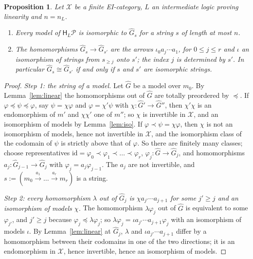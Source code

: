 \documentclass[11pt]{amsart}
\newtheorem{prop}[thm]{Proposition}
\theoremstyle{definition}
\newcommand{\HH}{\mathsf H}
\newcommand{\cX}{\mathcal X}
\newcommand{\cP}{\mathcal P}
\newcommand{\id}{\mathrm{id}}
\begin{document}
\begin{prop}\label{prop:strings}
Let $\cX$ be a finite EI-category, $L$ an intermediate logic proving
linearity and $n=n_L$.
\begin{enumerate}
\item[(a)] Every model of $\HH_L\cP$ is isomorphic to $\hat G_s$ for a
string $s$ of length at most $n$.
\item[(b)] The homomorphisms $\hat G_s\to\hat G_{s'}$ are the arrows
$\iota_0a_j\cdots a_1$, for $0\le j\le r$ and $\iota$ an isomorphism of
strings from $s_{\ge j}$ onto $s'$; the index $j$ is determined by
$s'$. In particular $\hat G_s\cong\hat G_{s'}$ if and only if $s$ and
$s'$ are isomorphic strings.
\end{enumerate}
\end{prop}
\begin{proof}
\emph{Step 1: the string of a model.} Let $\hat G$ be a model over
$m_0$. By Lemma~\ref{lem:linear} the homomorphisms out of $\hat G$ are
totally preordered by $\preceq$. If $\varphi\preceq\psi\preceq
\varphi$, say $\psi=\chi\varphi$ and $\varphi=\chi'\psi$ with
$\chi\colon\hat G'\to\hat G''$, then $\chi'\chi$ is an endomorphism of
$m'$ and $\chi\chi'$ one of $m''$; so $\chi$ is invertible in $\cX$,
and an isomorphism of models by Lemma~\ref{lem:iso}. If $\varphi\prec
\psi=\chi\varphi$, then $\chi$ is not an isomorphism of models, hence
not invertible in $\cX$, and the isomorphism class of the codomain of
$\psi$ is strictly above that of $\varphi$. So there are finitely many
classes; choose representatives $\id=\varphi_0\prec\varphi_1\prec\dots
\prec\varphi_r$, $\varphi_j\colon\hat G\to\hat G_j$, and homomorphisms
$a_j\colon\hat G_{j-1}\to\hat G_j$ with $\varphi_j=a_j\varphi_{j-1}$.
The $a_j$ are not invertible, and $s:=(m_0\xrightarrow{a_1}\dots
\xrightarrow{a_r}m_r)$ is a string.

\emph{Step 2: every homomorphism $\lambda$ out of $\hat G_j$ is
$\chi a_{j'}\cdots a_{j+1}$ for some $j'\ge j$ and an isomorphism of
models $\chi$.} The homomorphism $\lambda\varphi_j$ out of $\hat G$ is
equivalent to some $\varphi_{j'}$, and $j'\ge j$ because $\varphi_j
\preceq\lambda\varphi_j$; so $\lambda\varphi_j=\iota a_{j'}\cdots
a_{j+1}\varphi_j$ with an isomorphism of models $\iota$. By
Lemma~\ref{lem:linear} at $\hat G_j$, $\lambda$ and $\iota a_{j'}
\cdots a_{j+1}$ differ by a homomorphism between their codomains in
one of the two directions; it is an endomorphism in $\cX$, hence
invertible, hence an isomorphism of models.


\end{proof}
\end{document}
